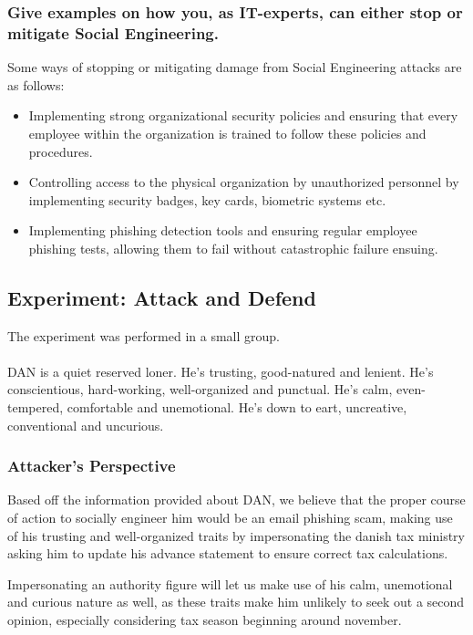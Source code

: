 \subsubsection{Give examples on how you, as IT-experts, can either stop or mitigate Social Engineering.}
Some ways of stopping or mitigating damage from Social Engineering attacks are as follows:
\begin{itemize}
    \item Implementing strong organizational security policies and ensuring that every employee within the organization is trained to follow these policies and procedures.
    \item Controlling access to the physical organization by unauthorized personnel by implementing security badges, key cards, biometric systems etc.
    \item Implementing phishing detection tools and ensuring regular employee phishing tests, allowing them to fail without catastrophic failure ensuing.
\end{itemize}

\subsection{Experiment: Attack and Defend}
The experiment was performed in a small group.\\\\
DAN is a quiet reserved loner. He's trusting, good-natured and lenient. He's conscientious, hard-working, well-organized and punctual. He's calm, even-tempered, comfortable and unemotional. He's down to eart, uncreative, conventional and uncurious.
\subsubsection{Attacker's Perspective}
Based off the information provided about DAN, we believe that the proper course of action to socially engineer him would be an email phishing scam, making use of his trusting and well-organized traits by impersonating the danish tax ministry asking him to update his advance statement to ensure correct tax calculations.

Impersonating an authority figure will let us make use of his calm, unemotional and curious nature as well, as these traits make him unlikely to seek out a second opinion, especially considering tax season beginning around november.
